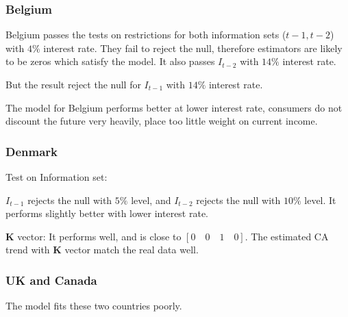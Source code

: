 \documentclass[12pt]{article}
\begin{document}
\begin{figure}[H]
\end{figure}





\subsubsection{Belgium}
Belgium passes the tests on restrictions for both information sets ($ t - 1, t - 2 $) 
with $ 4\% $ interest rate. They fail to reject the null, therefore estimators are 
likely to be zeros which satisfy the model. It also passes $ I_{t - 2} $ with 
$ 14\% $ interest rate.

But the result reject the null for $ I_{t - 1} $ with $ 14\% $ interest rate.


The model for Belgium performs better at lower interest rate, consumers do not discount
the future very heavily, place too little weight on current income.


\subsubsection{Denmark}
Test on Information set:

$ I_{t - 1} $ rejects the null with $ 5\% $ level, and $ I_{t - 2} $ rejects the
null with $ 10\% $ level.
It performs slightly better with lower interest rate.

$ \bm{K} $ vector:
It performs well, and is close to $ [0 \quad 0 \quad 1 \quad 0] $.
The estimated CA trend with $ \bm{K} $ vector match the real data well.


\subsubsection{UK and Canada}
The model fits these two countries poorly.
\end{document}
